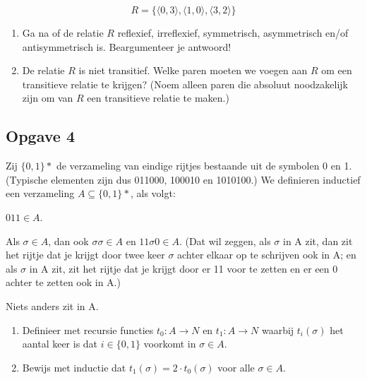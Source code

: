 \documentclass[11pt]{article}
\begin{document}
	\[ R=\{ \langle0, 3\rangle,
			\langle1, 0\rangle,
			\langle3, 2\rangle\}\]

\begin{enumerate}[label=\alph*]

	\item Ga na of de relatie $R$ reflexief, irreflexief, symmetrisch, asymmetrisch en/of antisymmetrisch is. Beargumenteer je antwoord!

	\item De relatie $R$ is niet transitief. Welke paren moeten we voegen aan $R$ om een transitieve relatie te krijgen? (Noem alleen paren die absoluut noodzakelijk zijn om van $R$ een transitieve relatie te maken.)

\end{enumerate}


\subsection*{Opgave 4}
Zij $\{0,1\}*$ de verzameling van eindige rijtjes bestaande uit de symbolen 0 en 1. (Typische elementen zijn dus 011000, 100010 en 1010100.) We definieren inductief een verzameling $A \subseteq \{0, 1\}*$, als volgt:

\begin{description}[font=$\bullet$\scshape\bfseries]

	\item $011 \in A$.

	\item Als $\sigma \in A$, dan ook $\sigma\sigma \in A$ en $11\sigma0 \in A$. (Dat wil zeggen, als $\sigma$ in A zit, dan zit het rijtje dat je krijgt door twee keer $\sigma$ achter elkaar op te schrijven ook in A; en als $\sigma$ in A zit, zit het rijtje dat je krijgt door er 11 voor te zetten en er een 0 achter te zetten ook in A.)

	\item Niets anders zit in A.
\end{description}

\begin{enumerate}[label=\alph*]

	\item Definieer met recursie functies $t_0 : A \rightarrow N$ en $t_1 : A \rightarrow N$ waarbij $t_i (\sigma)$ het aantal keer is dat $i \in \{0, 1\}$ voorkomt in $\sigma \in A$.

	\item Bewijs met inductie dat $t_1 (\sigma) = 2 \cdot t_0 (\sigma)$ voor alle $\sigma \in A$.
\end{enumerate}
\end{document}
